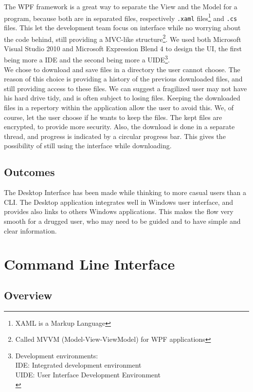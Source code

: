 \documentclass[a4paper,12pt, twocolumn]{article}
\begin{document}
The WPF framework is a great way to separate the View and the Model for a program, because both are in separated files, respectively \verb$.xaml$ files\footnote{XAML is a Markup Language} and \verb$.cs$ files. This let the development team focus on interface while no worrying about the code behind, still providing a MVC-like structure\footnote{Called MVVM (Model-View-ViewModel) for WPF applications}. We used both Microsoft Visual Studio 2010 and Microsoft Expression Blend 4 to design the UI, the first being more a IDE and the second being more a UIDE\footnote{Development environments:\\IDE: Integrated development environment\\UIDE: User Interface Development Environment\\}.\\

We chose to download and save files in a directory the user cannot choose. The reason of this choice is providing a history of the previous downloaded files, and still providing access to these files. We can suggest a fragilized user may not have his hard drive tidy, and is often subject to losing files. Keeping the downloaded files in a repertory within the application allow the user to avoid this. We, of course, let the user choose if he wants to keep the files. The kept files are encrypted, to provide more security. Also, the download is done in a separate thread, and progress is indicated by a circular progress bar. This gives the possibility of still using the interface while downloading.

\subsection*{Outcomes}
The Desktop Interface has been made while thinking to more casual users than a CLI. The Desktop application integrates well in Windows user interface, and provides also links to others Windows applications. This makes the flow very smooth for a drugged user, who may need to be guided and to have simple and clear information.\\



\section*{Command Line Interface}\label{cli}

\subsection*{Overview}
\end{document}
